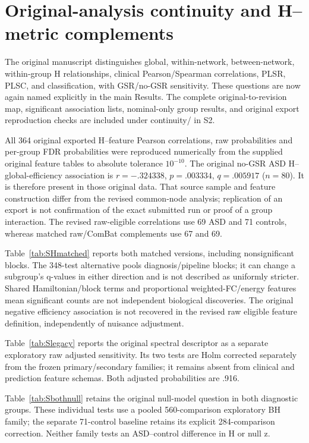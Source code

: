 \documentclass[10pt,letterpaper]{article}
\begin{document}
\section*{Original-analysis continuity and H--metric complements}
The original manuscript distinguishes global, within-network, between-network,
within-group H relationships, clinical Pearson/Spearman correlations, PLSR,
PLSC, and classification, with GSR/no-GSR sensitivity. These questions are now
again named explicitly in the main Results. The complete original-to-revision
map, significant association lists, nominal-only group results, and original
export reproduction checks are included under continuity/ in S2.

All 364 original exported H--feature Pearson correlations, raw probabilities and
per-group FDR probabilities were reproduced numerically from the supplied original
feature tables to absolute tolerance $10^{-10}$. The original no-GSR ASD
H--global-efficiency association is $r=-.324338$, $p=.003334$, $q=.005917$
($n=80$). It is therefore present in those original data. That source sample and
feature construction differ from the revised common-node analysis; replication
of an export is not confirmation of the exact submitted run or proof of a group
interaction. The revised raw-eligible correlations use 69 ASD and 71 controls,
whereas matched raw/ComBat complements use 67 and 69.

Table~\ref{tab:SHmatched} reports both matched versions, including nonsignificant
blocks. The 348-test alternative pools diagnosis/pipeline blocks; it can change
a subgroup's q-values in either direction and is not described as uniformly
stricter. Shared Hamiltonian/block terms and proportional weighted-FC/energy
features mean significant counts are not independent biological discoveries.
The original negative efficiency association is not recovered in the revised
raw eligible feature definition, independently of nuisance adjustment.



Table~\ref{tab:Slegacy} reports the original spectral descriptor as a separate
exploratory raw adjusted sensitivity. Its two tests are Holm corrected separately
from the frozen primary/secondary families; it remains absent from clinical and
prediction feature schemas. Both adjusted probabilities are .916.



Table~\ref{tab:Sbothnull} retains the original null-model question in both diagnostic
groups. These individual tests use a pooled 560-comparison exploratory BH family;
the separate 71-control baseline retains its explicit 284-comparison correction.
Neither family tests an ASD--control difference in H or null z.
\end{document}
